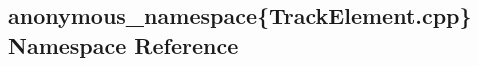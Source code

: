 \hypertarget{namespaceanonymous__namespace_02TrackElement_8cpp_03}{\subsection{anonymous\-\_\-namespace\{Track\-Element.\-cpp\} Namespace Reference}
\label{namespaceanonymous__namespace_02TrackElement_8cpp_03}
}
